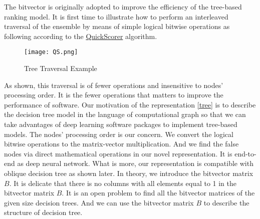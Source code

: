 \documentclass[UTF8]{article}
\begin{document}
The bitvector is originally adopted to improve the efficiency of the tree-based ranking model.
It is first time to illustrate how to perform an interleaved traversal of the ensemble
by means of simple logical bitwise operations as following according to
the \href{http://pages.di.unipi.it/rossano/wp-content/uploads/sites/7/2015/11/sigir15.pdf}{QuickScorer} algorithm.
\begin{figure}[H] %
\centering %
\texttt{[image: QS.png]}
\caption{Tree Traversal Example}  %
\label{Fig.TTE} %
\footnotemark
\end{figure}

As shown, this traversal is of fewer operations and insensitive to nodes' processing order.
It is the fewer operations that matters to improve the performance of software.
Our motivation of the representation \eqref{tree} is to describe the decision tree model
in the language of computational graph
so that we can take advantages of deep learning software packages to implement tree-based models.
The nodes' processing order is our concern.
We convert the logical bitwise operations to the matrix-vector multiplication.
And we find  the false nodes via direct mathematical operations in our novel representation.
It is end-to-end as deep  neural network.
What is more, our representation is compatible with oblique decision tree as shown later.
In theory, we introduce the bitvector matrix $B$.
It is delicate that there is no columns with all elements equal to 1 in the bitvector matrix $B$.
It is an open problem to find all the bitvector matrices of the given size decision trees.
And we can use the bitvector matrix $B$ to describe the structure of decision tree.
\end{document}
